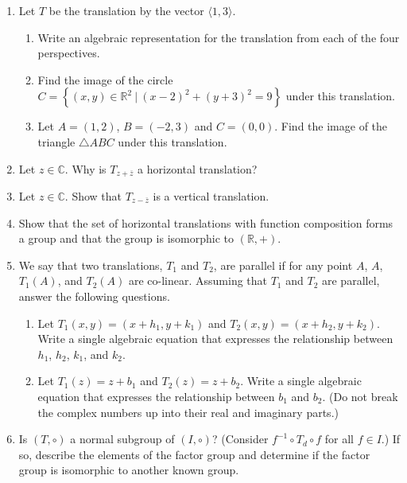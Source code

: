 \documentclass[
]{book}
\providecommand{\tightlist}{%
  \setlength{\itemsep}{0pt}\setlength{\parskip}{0pt}}
\theoremstyle{definition}
\theoremstyle{definition}
\theoremstyle{definition}
\theoremstyle{definition}
\theoremstyle{remark}
\begin{document}
\begin{enumerate}
\def\labelenumi{\arabic{enumi}.}
\item
  Let \(T\) be the translation by the vector \(\langle 1,3\rangle\).

  \begin{enumerate}
  \def\labelenumii{\alph{enumii}.}
  \tightlist
  \item
    Write an algebraic representation for the translation from each of the four perspectives.
  \item
    Find the image of the circle \(C=\left\{ (x,y)\in \mathbb{R}^2 \: \vert \: (x-2)^2+(y+3)^2 =9\right\}\) under this translation.
  \item
    Let \(A=(1,2)\), \(B=(-2,3)\) and \(C=(0,0)\). Find the image of the triangle \(\triangle ABC\) under this translation.
  \end{enumerate}
\item
  Let \(z\in \mathbb{C}\). Why is \(T_{z+\overline{z}}\) a horizontal translation?
\item
  Let \(z\in \mathbb{C}\). Show that \(T_{z-\overline{z}}\) is a vertical translation.
\item
  Show that the set of horizontal translations with function composition forms a group and that the group is isomorphic to \((\mathbb{R},+)\).
\item
  We say that two translations, \(T_1\) and \(T_2\), are parallel if for any point \(A\), \(A\), \(T_1(A)\), and \(T_2(A)\) are co-linear. Assuming that \(T_1\) and \(T_2\) are parallel, answer the following questions.

  \begin{enumerate}
  \def\labelenumii{\alph{enumii}.}
  \tightlist
  \item
    Let \(T_1(x,y)=(x+h_1,y+k_1)\) and \(T_2(x,y)=(x+h_2,y+k_2)\). Write a single algebraic equation that expresses the relationship between \(h_1\), \(h_2\), \(k_1\), and \(k_2\).
  \item
    Let \(T_1(z)=z+b_1\) and \(T_2(z)=z+b_2\). Write a single algebraic equation that expresses the relationship between \(b_1\) and \(b_2\). (Do not break the complex numbers up into their real and imaginary parts.)
  \end{enumerate}
\item
  Is \((T,\circ )\) a normal subgroup of \((I,\circ )\)? (Consider \(f^{-1} \circ T_d \circ f\) for all \(f\in I\).) If so, describe the elements of the factor group and determine if the factor group is isomorphic to another known group.
\end{enumerate}
\end{document}
